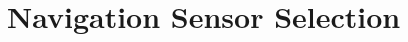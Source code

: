 \documentclass[preprint,authoryear,12pt]{elsarticle}
\begin{document}
\section{Navigation Sensor Selection}
\label{sect:sensors}

\end{document}
